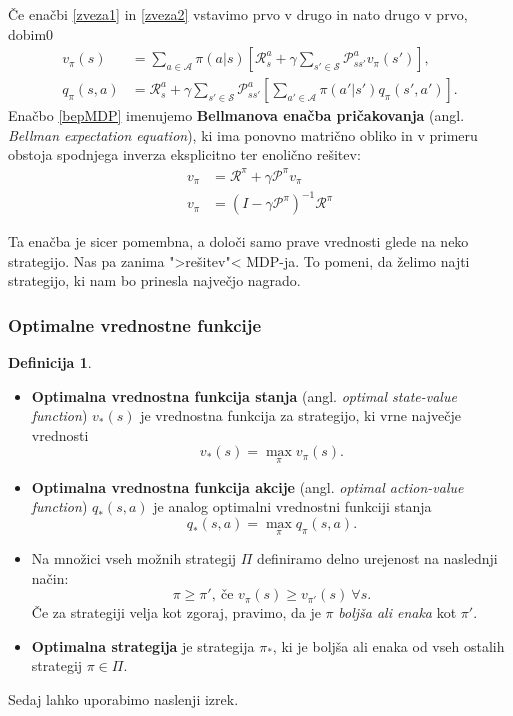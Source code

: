 \documentclass[12pt,a4paper]{amsart}
\theoremstyle{definition} %
\newtheorem{definicija}{Definicija}[section]
\theoremstyle{plain} %
\begin{document}
Če enačbi \eqref{zveza1} in \eqref{zveza2} vstavimo prvo v drugo in nato drugo v prvo, dobim0
\begin{align}
    v_\pi(s) &= \sum_{a \in \mathcal{A}} \pi(a|s) \left[\mathcal{R}_s^a + 
    \gamma \sum_{s' \in \mathcal{S}} \mathcal{P}_{ss'}^a v_\pi(s') \right], \label{bepMDP} \\
    q_\pi(s, a) &= \mathcal{R}_s^a + \gamma \sum_{s' \in \mathcal{S}} 
    \mathcal{P}_{ss'}^a \left[\sum_{a' \in \mathcal{A}} \pi(a'|s')q_\pi(s', a') \right].
\end{align}
Enačbo \eqref{bepMDP} imenujemo \textbf{Bellmanova enačba pričakovanja} (angl. \textit{Bellman 
expectation equation}), ki ima ponovno matrično obliko in v primeru obstoja spodnjega inverza
eksplicitno ter enolično rešitev: 
\begin{align*}
    v_\pi &= \mathcal{R}^\pi + \gamma \mathcal{P}^\pi v_\pi \\
    v_\pi &= (I - \gamma \mathcal{P}^\pi)^{-1} \mathcal{R}^\pi
\end{align*}

Ta enačba je sicer pomembna, a določi samo prave vrednosti glede na neko strategijo. Nas pa zanima 
">rešitev"< MDP-ja. To pomeni, da želimo najti strategijo, ki nam bo prinesla največjo nagrado.

\subsubsection{Optimalne vrednostne funkcije}
\begin{definicija}
    ~
    \begin{itemize}
        \item \textbf{Optimalna vrednostna funkcija stanja} (angl. \textit{optimal state-value 
                function}) $v_*(s)$ je vrednostna funkcija za strategijo, ki vrne največje vrednosti
                $$
                v_*(s) = \max_\pi v_\pi(s).
                $$
        \item \textbf{Optimalna vrednostna funkcija akcije} (angl. \textit{optimal action-value 
                function}) $q_*(s, a)$ je analog optimalni vrednostni funkciji stanja
                $$
                q_*(s, a) = \max_\pi q_\pi(s, a).
                $$
        \item Na množici vseh možnih strategij $\Pi$ definiramo delno urejenost na naslednji način:
                $$
                \pi \geq \pi', \medspace \text{če } v_\pi(s) \geq v_{\pi'}(s) ~ \forall s. 
                $$
                Če za strategiji velja kot zgoraj, pravimo, da je $\pi$ \textit{boljša ali enaka} 
                kot $\pi'$.
        \item \textbf{Optimalna strategija} je strategija $\pi_*$, ki je boljša ali enaka od vseh 
                ostalih strategij $\pi \in \Pi$.
    \end{itemize}
\end{definicija}
Sedaj lahko uporabimo naslenji izrek.
\end{document}
